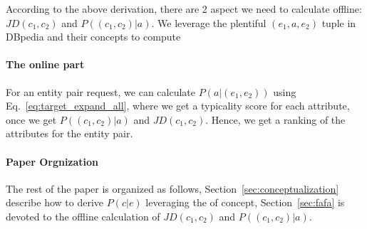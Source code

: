 According to the above derivation, there are 2 aspect we need to calculate offline: $JD(c_1,c_2)$ and $P((c_{1},c_{2})|a)$. 
We leverage the plentiful $(e_1,a,e_2)$ tuple in DBpedia and their concepts to compute




\paragraph{The online part}
For an entity pair request, we can calculate $ P(a| (e_1,e_2) )$ using Eq.~\ref{eq:target_expand_all}, where we get a typicality score for each attribute, once we get $P((c_{1},c_{2})|a)$ and $JD(c_1,c_2)$. Hence, we get a ranking of the attributes for the entity pair. 


\paragraph{Paper Orgnization}
The rest of the paper is organized as follows, Section~\ref{sec:conceptualization} describe how to derive $P(c|e)$ leveraging the  of concept, Section~\ref{sec:fafa} is devoted to the offline calculation of $JD(c_1,c_2)$ and $P((c_{1},c_{2})|a)$. 

%
%
%
%
%
%
%
%
%
%
%
%
%
